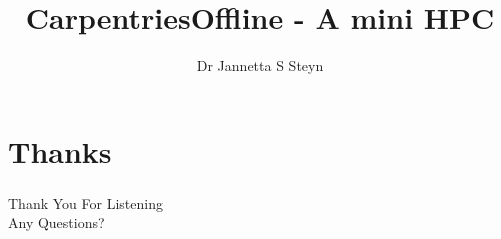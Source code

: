 \documentclass[aspectratio=169]{beamer}
\title{CarpentriesOffline - A mini HPC}
\author{
    Dr Jannetta S Steyn  
}
\institute{
    Newcastle University
}
\date{\shortdate{\formatdate{2025}{03}{27}}}
\begin{document}


\frame{\titlepage}



 







\section*{Thanks}
\begin{frame}
\frametitle{}
\centering\LARGE Thank You For Listening \\
\centering\LARGE Any Questions?
\end{frame}
\end{document}

